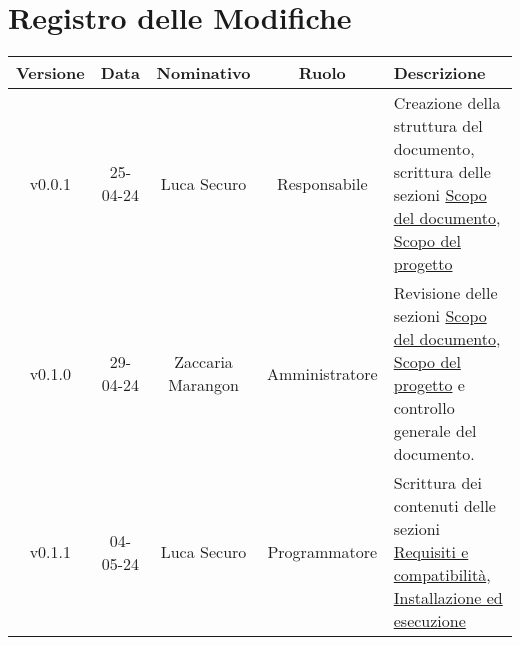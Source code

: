 \section*{\Large Registro delle Modifiche}
    \begin{table}[h]
        \centering
        \renewcommand\tabularxcolumn[1]{m{#1}} %
        \renewcommand{\arraystretch}{1.5}
        \begin{tabularx}{0.98\textwidth}
            {c|c|c|c|>{\centering\arraybackslash}X}
            \rowcolor{black}
            \textbf{\color{white} Versione} & \textbf{\color{white} Data} & \textbf{\color{white} Nominativo} & \textbf{\color{white} Ruolo} & \textbf{\color{white} Descrizione} \\ 
            \hline

            
            
            v0.0.1 & 25-04-24 & Luca Securo & Responsabile & Creazione della struttura del documento, scrittura delle sezioni \hyperref[sec:scopo_del_documento]{Scopo del documento}, 
                                                             \hyperref[sec:scopo_del_progetto]{Scopo del progetto}\\
            v0.1.0 & 29-04-24 & Zaccaria Marangon & Amministratore & Revisione delle sezioni \hyperref[sec:scopo_del_documento]{Scopo del documento}, 
                                                                     \hyperref[sec:scopo_del_progetto]{Scopo del progetto} e controllo generale del documento.\\
            v0.1.1 & 04-05-24 & Luca Securo & Programmatore & Scrittura dei contenuti delle sezioni \hyperref[sec:requisiti_e_compatibilità]{Requisiti
                                                            e compatibilità}, \hyperref[sec:install_run]{Installazione ed esecuzione}\\
            
            
               
            
            \hline
        \end{tabularx}
    \end{table}